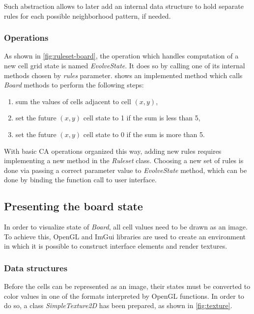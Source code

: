 \documentclass[12pt]{report}
\begin{document}
Such abstraction allows to later add an internal data structure to hold separate rules for each possible neighborhood pattern, if needed. 

\subsubsection{Operations}

As shown in \cref{fig:ruleset-board}, the operation which handles computation of a new cell grid state is named \textit{EvolveState}. It does so by calling one of its internal methods chosen by \textit{rules} parameter.  shows an implemented method which calls \textit{Board} methods to perform the following steps:

\begin{enumerate}
	\item sum the values of cells adjacent to cell $(x,y)$,
	\item set the future $(x,y)$ cell state to 1 if the sum is less than 5,
	\item set the future $(x,y)$ cell state to 0 if the sum is more than 5.
\end{enumerate}




With basic CA operations organized this way, adding new rules requires implementing a new method in the \textit{Ruleset} class. Choosing a new set of rules is done via passing a correct parameter value to \textit{EvolveState} method, which can be done by binding the function call to user interface.

\subsection{Presenting the board state}

In order to visualize state of \textit{Board}, all cell values need to be drawn as an image. To achieve this, OpenGL and ImGui libraries are used to create an environment in which it is possible to construct interface elements and render textures.    

\subsubsection{Data structures}

Before the cells can be represented as an image, their states must be converted to color values in one of the formats interpreted by OpenGL functions. In order to do so, a class \textit{SimpleTexture2D} has been prepared, as shown in \cref{fig:texture}. 
\end{document}
